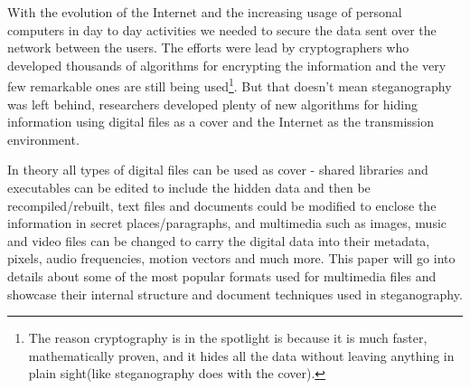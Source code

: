 
With the evolution of the Internet and the increasing usage of personal computers in day to day activities we needed to secure the data sent over the network between the users. The efforts were lead by cryptographers who developed thousands of algorithms for encrypting the information and the very few remarkable ones are still being used\footnote{The reason cryptography is in the spotlight is because it is much faster, mathematically proven, and it hides all the data without leaving anything in plain sight(like steganography does with the cover).}.  But that doesn't mean steganography was left behind, researchers developed plenty of new algorithms for hiding information using digital files as a cover and the Internet as the transmission environment.

In theory all types of digital files can be used as cover  - shared libraries and executables can be edited to include the hidden data and then be recompiled/rebuilt, text files and documents could be modified to enclose the information in secret places/paragraphs, and multimedia such as images, music and video files can be changed to carry the digital data into their metadata, pixels, audio frequencies, motion vectors and much more. This paper will go into details about some of the most popular formats used for multimedia files and showcase their internal structure and document techniques used in steganography.




